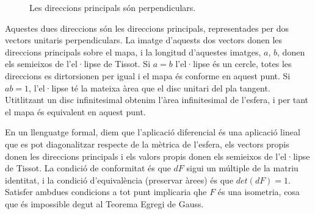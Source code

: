 \documentclass[a4paper,12pt]{article}
\begin{document}
\begin{figure}[ht]
 \begin{center}
  \def\svgwidth{ 0.85 \textwidth}

\caption{Les direccions principals són perpendiculars.}
 \end{center}
\end{figure}

Aquestes dues direccions són les direccions principals, representades per dos vectors unitaris perpendiculars. La imatge d'aquests dos vectors donen les direccions principals sobre el mapa, i la longitud d'aquestes imatges, $a$, $b$, donen els semieixos de l'el·lipse de Tissot. Si $a=b$ l'el·lipse és un cercle, totes les direccions es dirtorsionen per igual i el mapa és conforme en aquest punt. Si $ab=1$, l'el·lipse té la mateixa àrea que el disc unitari del pla tangent. Utitlitzant un disc infinitesimal obtenim l'àrea infinitesimal de l'esfera, i per tant el mapa és equivalent en aquest punt.

En un llenguatge formal, diem que l'aplicació diferencial és una aplicació lineal que es pot diagonalitzar respecte de la mètrica de l'esfera, els vectors propis donen les direccions principals i els valors propis donen els semieixos de l'el·lipse de Tissot. La condició de conformitat és que $dF$ sigui un múltiple de la matriu identitat, i la condició d'equivalència (preservar àrees) és que $det(dF)=1$. Satisfer ambdues condicions a tot punt implicaria qhe $F$ és una isometria, cosa que és impossible degut al Teorema Egregi de Gauss.

 
 
\end{document}
